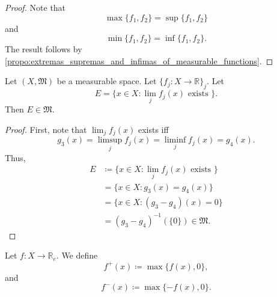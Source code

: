 \documentclass[notoc,notitlepage]{tufte-book}
\begin{document}
\begin{proof}
  Note that
  \begin{equation*}
    \max \{ f_1, f_2 \} = \sup \{ f_1, f_2 \}
  \end{equation*}
  and
  \begin{equation*}
    \min \{ f_1, f_2 \} = \inf \{ f_1, f_2 \}.
  \end{equation*}
  The result follows by
  \cref{propo:extremas_supremas_and_infimas_of_measurable_functions}.
\end{proof}

\begin{crly}\label{crly:limit_points_of_a_sequence_of_measurable_functions_forms_a_measurable_set}
  Let $(X, \mathfrak{M})$ be a measurable space.
  Let $\{ f_j : X \to \mathbb{R} \}_j$.
  Let
  \begin{equation*}
    E = \{ x \in X : \lim_{j} f_j(x) \text{ exists } \}.
  \end{equation*}
  Then $E \in \mathfrak{M}$.
\end{crly}

\begin{proof}
  First, note that $\lim_{j} f_j(x)$ exists iff
  \begin{equation*}
    g_3(x) = \limsup_{j} f_j(x) = \liminf_{j} f_j(x) = g_4(x).
  \end{equation*}
  Thus,
  \begin{align*}
    E &\coloneqq \{ x \in X : \lim_{j} f_j(x) \text{ exists } \} \\
      &= \{ x \in X : g_3(x) = g_4(x) \} \\
      &= \{ x \in X : (g_3 - g_4)(x) = 0 \} \\
      &= (g_3 - g_4)^{-1}(\{0\}) \in \mathfrak{M}.
  \end{align*}
\end{proof}

\begin{defn}[$f^+$ and $f^-$]\label{defn:f_plus_and_f_minus}
  Let $f : X \to \mathbb{R}_e$.
  We define
  \begin{equation*}
    f^+(x) \coloneqq \max \{ f(x), 0 \},
  \end{equation*}
  and
  \begin{equation*}
    f^-(x) \coloneqq \max \{ -f(x), 0 \}.
  \end{equation*}
\end{defn}
\end{document}

